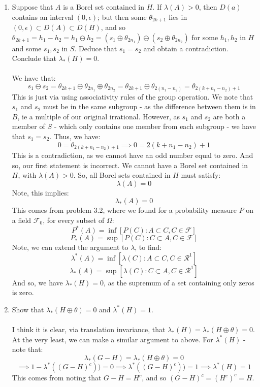 \documentclass[12pt,a4paper]{article}
\newcommand{\1}[1]{\mathbbm{1}\left\{ #1 \right\}}
\newcommand{\fcal}{\mathcal{F}}
\newcommand{\rcal}{\mathcal{R}}
\begin{document}
\begin{enumerate}
	\item Suppose that $A$ is a Borel set contained in $H$. If $\lambda(A) > 0$, then $D(a)$ contains an interval $(0,\epsilon)$; but then some $\theta_{2k + 1}$ lies in $(0,\epsilon) \subset D(A) \subset D(H)$, and so $\theta_{2k + 1} = h_1 - h_2 = h_1 \ominus h_2 = (s_1 \oplus \theta_{2n_1}) \ominus (s_2 \oplus \theta_{2n_2})$ for some $h_1,h_2$ in $H$ and some $s_1,s_2$ in $S$. Deduce that $s_1 = s_2$ and obtain a contradiction. Conclude that $\lambda_*(H) = 0$.
	\\\\
	We have that:
	$$
		s_1 \ominus s_2 = \theta_{2k + 1} \ominus \theta_{2n_1} \oplus \theta_{2n_2} = \theta_{2k+1} \ominus \theta_{2(n_1-n_2)} =
		\theta_{2(k + n_1 - n_2) + 1}
	$$
	This is just via using associativity rules of the group operation. We note that $s_1$ and $s_2$ must be in the same subgroup - as the difference between them is in $B$, ie a multiple of our original irrational. However, as $s_1$ and $s_2$ are both a member of $S$ - which only contains one member from each subgroup - we have that $s_1 = s_2$. Thus, we have:
	$$
		0 = \theta_{2(k + n_1 - n_2) + 1} \implies
		0 = 2(k + n_1 - n_2) + 1
	$$
	This is a contradiction, as we cannot have an odd number equal to zero. And so, our first statement is incorrect. We cannot have a Borel set contained in $H$, with $\lambda(A) > 0$. So, all Borel sets contained in $H$ must satisfy:
	$$
		\lambda(A) = 0
	$$
	Note, this implies:
	$$
		\lambda_*(A) = 0
	$$
	This comes from problem 3.2, where we found for a probability measure $P$ on a field $\fcal_0$, for every subset of $\Omega$:
	$$
		P^*(A) = \inf\left[P(C): A \subset C, C \in \fcal\right]
	$$
	$$
		P_*(A) = \sup\left[P(C): C \subset A, C \in \fcal\right]
	$$
	Note, we can extend the argument to $\lambda$, to find:
	$$
		\lambda^*(A) = \inf\left[\lambda(C): A \subset C, C \in \rcal^1\right]
	$$
	$$
		\lambda_*(A) = \sup\left[\lambda(C): C \subset A, C \in \rcal^1\right]
	$$
	And so, we have $\lambda_*(H) = 0$, as the supremum of a set containing only zeros is zero.
	
	\item Show that $\lambda_*(H \oplus \theta) = 0$ and $\lambda^*(H) = 1$.
	\\\\
	I think it is clear, via translation invariance, that $\lambda_*(H) = \lambda_*(H \oplus \theta) = 0$. At the very least, we can make a similar argument to above. For $\lambda^*(H)$ - note that:
	$$
		\lambda_*(G - H) = \lambda_*(H \oplus \theta) = 0
	$$
	$$
		\implies 1 - \lambda^*((G - H)^c)) = 0 \implies
		\lambda^*((G - H)^c)) = 1 \implies
		\lambda^*(H) = 1
	$$
	This comes from noting that $G - H = H^c$, and so $(G - H)^c = (H^c)^c = H$. 
	
\end{enumerate}
\end{document}
